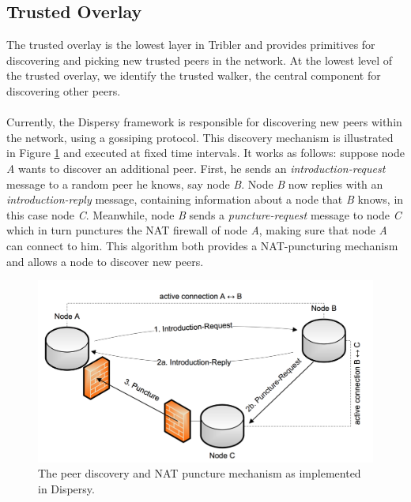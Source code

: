\subsection{Trusted Overlay}
The trusted overlay is the lowest layer in Tribler and provides primitives for discovering and picking new trusted peers in the network. At the lowest level of the trusted overlay, we identify the trusted walker, the central component for discovering other peers.\\\\
Currently, the Dispersy framework is responsible for discovering new peers within the network, using a gossiping protocol\cite{zeilemaker2013dispersy}. This discovery mechanism is illustrated in Figure \ref{fig:dispersy-discover} and executed at fixed time intervals. It works as follows: suppose node \emph{A} wants to discover an additional peer. First, he sends an \emph{introduction-request} message to a random peer he knows, say node \emph{B}. Node \emph{B} now replies with an \emph{introduction-reply} message, containing information about a node that \emph{B} knows, in this case node \emph{C}. Meanwhile, node \emph{B} sends a \emph{puncture-request} message to node \emph{C} which in turn punctures the NAT firewall of node \emph{A}, making sure that node \emph{A} can connect to him. This algorithm both provides a NAT-puncturing mechanism and allows a node to discover new peers.\\

\begin{figure}[h!]
	\centering
	\includegraphics[width=0.7\columnwidth]{images/architecture/dispersy_discover}
	\caption{The peer discovery and NAT puncture mechanism as implemented in Dispersy.}
	\label{fig:dispersy-discover}
\end{figure}

